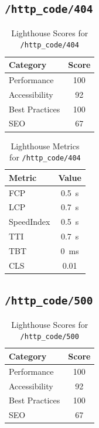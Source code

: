 \subsection{\texttt{/http\_code/404}}

\begin{table}[H]
  \centering
  \caption{Lighthouse Scores for \texttt{/http\_code/404}}
  \begin{tabular}{|l|c|}
    \hline
    Category & Score \\ \hline
    Performance & 100 \\ \hline
    Accessibility & 92 \\ \hline
    Best Practices & 100 \\ \hline
    SEO & 67 \\ \hline
  \end{tabular}
\end{table}

\begin{table}[H]
  \centering
  \caption{Lighthouse Metrics for \texttt{/http\_code/404}}
  \begin{tabular}{|l|c|}
    \hline
    Metric & Value \\ \hline
    FCP & 0.5 s \\ \hline
    LCP & 0.7 s \\ \hline
    SpeedIndex & 0.5 s \\ \hline
    TTI & 0.7 s \\ \hline
    TBT & 0 ms \\ \hline
    CLS & 0.01 \\ \hline
  \end{tabular}
\end{table}
\subsection{\texttt{/http\_code/500}}

\begin{table}[H]
  \centering
  \caption{Lighthouse Scores for \texttt{/http\_code/500}}
  \begin{tabular}{|l|c|}
    \hline
    Category & Score \\ \hline
    Performance & 100 \\ \hline
    Accessibility & 92 \\ \hline
    Best Practices & 100 \\ \hline
    SEO & 67 \\ \hline
  \end{tabular}
\end{table}

